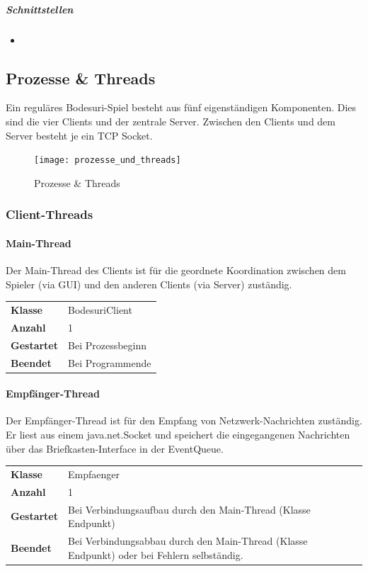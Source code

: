 \documentclass[12pt,halfparskip]{scrartcl}
\begin{document}
		\subparagraph{Schnittstellen}
		\begin{itemize}
			\item 
		\end{itemize}	

\subsection{Prozesse \& Threads}
Ein reguläres Bodesuri-Spiel besteht aus fünf eigenständigen Komponenten. Dies sind die vier Clients und der zentrale Server. Zwischen den Clients und dem Server besteht je ein TCP Socket. 

\begin{figure}[h]
	\centering
	\texttt{[image: prozesse\_und\_threads]}
	\caption{Prozesse \& Threads}
	\label{fig:prozesse_und_threads}
\end{figure}

\clearpage
\subsubsection{Client-Threads}
\label{ssub:client_threads}

\paragraph{Main-Thread}
\label{ssub:main_thread}

Der Main-Thread des Clients ist für die geordnete Koordination zwischen dem Spieler (via GUI) und den anderen Clients (via Server) zuständig.


\begin{tabular}{@{} l p{12.5cm}}
\textbf{Klasse}       & BodesuriClient \\
\textbf{Anzahl}       & 1 \\
\textbf{Gestartet}    & Bei Prozessbeginn \\
\textbf{Beendet}      & Bei Programmende
\end{tabular}

\paragraph{Empfänger-Thread}

Der Empfänger-Thread ist für den Empfang von Netzwerk-Nachrichten zuständig. Er liest aus einem java.net.Socket und speichert die eingegangenen Nachrichten über das Briefkasten-Interface in der EventQueue.

\begin{tabular}{@{} l p{12.5cm}}
\textbf{Klasse}       & Empfaenger \\
\textbf{Anzahl}       & 1 \\
\textbf{Gestartet}    & Bei Verbindungsaufbau durch den Main-Thread (Klasse Endpunkt) \\
\textbf{Beendet}      & Bei Verbindungsabbau durch den Main-Thread (Klasse Endpunkt) oder bei Fehlern selbständig.
\end{tabular}
\end{document}
